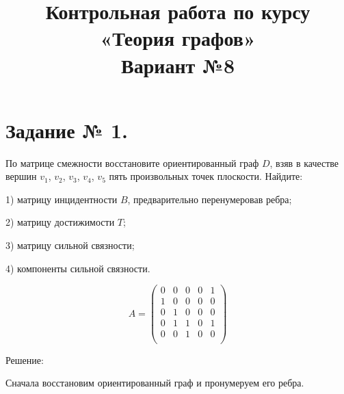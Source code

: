 \documentclass[fleqn]{article}
\title{Контрольная работа по курсу «Теория графов»\\
Вариант №8}
\begin{document}
\date{}
\maketitle
\section*{Задание № 1.}

По матрице смежности восстановите ориентированный граф $D$,
взяв в качестве вершин $v_1$, $v_2$, $v_3$, $v_4$, $v_5$ пять произвольных точек плоскости. Найдите:

1) матрицу инцидентности $B$, предварительно перенумеровав ребра;

2) матрицу достижимости $T$;

3) матрицу сильной связности;

4) компоненты сильной связности.

$$A = \begin{pmatrix}
0 & 0 & 0 & 0 & 1 \\
1 & 0 & 0 & 0 & 0 \\
0 & 1 & 0 & 0 & 0 \\
0 & 1 & 1 & 0 & 1 \\
0 & 0 & 1 & 0 & 0 \\
\end{pmatrix}
$$

\begin{center}Решение:\end{center}

Сначала восстановим ориентированный граф и пронумеруем его ребра.

\medskip

\end{document}
